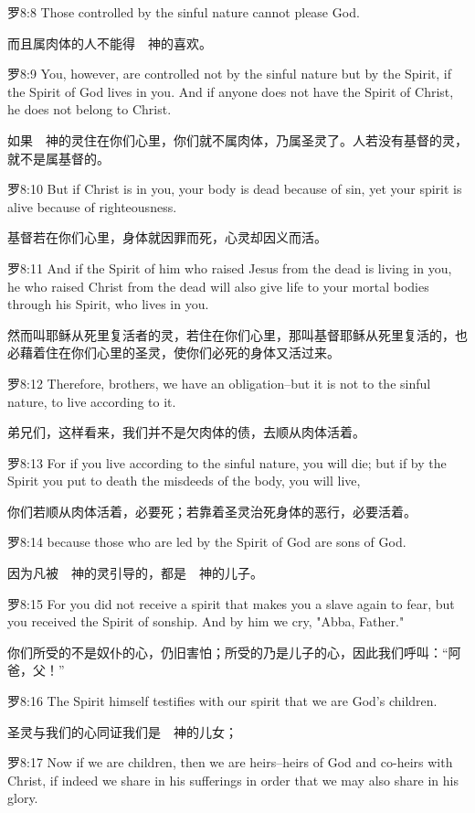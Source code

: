 \documentclass[a4paper,11pt,onecolumn,twoside]{ctexart}
\begin{document}
\begin{multicols}{2}
 罗8:8
 Those controlled by the sinful nature cannot please God.

 而且属肉体的人不能得　神的喜欢。


 罗8:9
 You, however, are controlled not by the sinful nature but by the Spirit, if the Spirit of God lives in you. And if anyone does not have the Spirit of Christ, he does not belong to Christ.

 如果　神的灵住在你们心里，你们就不属肉体，乃属圣灵了。人若没有基督的灵，就不是属基督的。


 罗8:10
 But if Christ is in you, your body is dead because of sin, yet your spirit is alive because of righteousness.

 基督若在你们心里，身体就因罪而死，心灵却因义而活。


 罗8:11
 And if the Spirit of him who raised Jesus from the dead is living in you, he who raised Christ from the dead will also give life to your mortal bodies through his Spirit, who lives in you.

 然而叫耶稣从死里复活者的灵，若住在你们心里，那叫基督耶稣从死里复活的，也必藉着住在你们心里的圣灵，使你们必死的身体又活过来。


 罗8:12
 Therefore, brothers, we have an obligation--but it is not to the sinful nature, to live according to it.

 弟兄们，这样看来，我们并不是欠肉体的债，去顺从肉体活着。


 罗8:13
 For if you live according to the sinful nature, you will die; but if by the Spirit you put to death the misdeeds of the body, you will live,

 你们若顺从肉体活着，必要死；若靠着圣灵治死身体的恶行，必要活着。


 罗8:14
 because those who are led by the Spirit of God are sons of God.

 因为凡被　神的灵引导的，都是　神的儿子。


 罗8:15
 For you did not receive a spirit that makes you a slave again to fear, but you received the Spirit of sonship. And by him we cry, "Abba, Father."

 你们所受的不是奴仆的心，仍旧害怕；所受的乃是儿子的心，因此我们呼叫：“阿爸，父！”


 罗8:16
 The Spirit himself testifies with our spirit that we are God's children.

 圣灵与我们的心同证我们是　神的儿女；


 罗8:17
 Now if we are children, then we are heirs--heirs of God and co-heirs with Christ, if indeed we share in his sufferings in order that we may also share in his glory.


\end{multicols}
\end{document}
